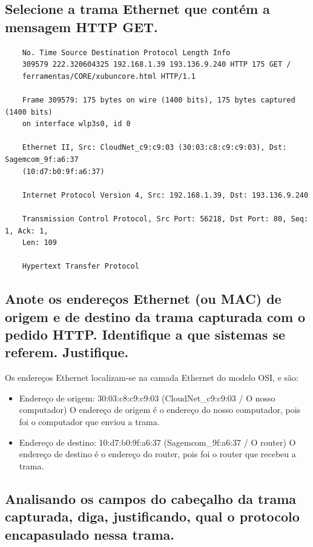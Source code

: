 \documentclass{article}
\begin{document}
\subsection*{Selecione a trama Ethernet que contém a mensagem HTTP GET.}

\begin{verbatim}
    No. Time Source Destination Protocol Length Info
    309579 222.320604325 192.168.1.39 193.136.9.240 HTTP 175 GET /
    ferramentas/CORE/xubuncore.html HTTP/1.1

    Frame 309579: 175 bytes on wire (1400 bits), 175 bytes captured (1400 bits) 
    on interface wlp3s0, id 0

    Ethernet II, Src: CloudNet_c9:c9:03 (30:03:c8:c9:c9:03), Dst: Sagemcom_9f:a6:37
    (10:d7:b0:9f:a6:37)

    Internet Protocol Version 4, Src: 192.168.1.39, Dst: 193.136.9.240

    Transmission Control Protocol, Src Port: 56218, Dst Port: 80, Seq: 1, Ack: 1, 
    Len: 109

    Hypertext Transfer Protocol
\end{verbatim}

\subsection{Anote os endereços Ethernet (ou MAC) de origem e de destino da trama
capturada com o pedido HTTP. Identifique a que sistemas se referem. Justifique.}

Os endereços Ethernet localizam-se na camada Ethernet do modelo OSI, e são:
\begin{itemize}
    \item Endereço de origem: 30:03:c8:c9:c9:03 (CloudNet\_c9:c9:03 / O nosso computador) \linebreak
    O endereço de origem é o endereço do nosso computador, pois foi o computador que enviou a trama.
    \item Endereço de destino: 10:d7:b0:9f:a6:37 (Sagemcom\_9f:a6:37 / O router) \linebreak
    O endereço de destino é o endereço do router, pois foi o router que recebeu a trama.
\end{itemize}

\subsection{Analisando os campos do cabeçalho da trama capturada, diga, justificando, qual
o protocolo encapasulado nessa trama.}
\end{document}
